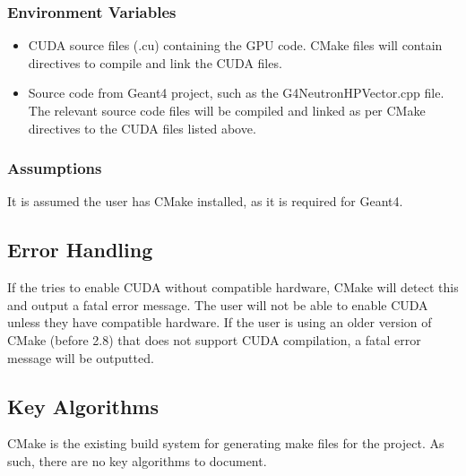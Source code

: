 \documentclass[12pt]{article}
\begin{document}
\subsubsection{Environment Variables}%
\begin{itemize}
\item CUDA source files (.cu) containing the GPU code. CMake files will contain directives to compile and link the CUDA files.
\item Source code from Geant4 project, such as the G4NeutronHPVector.cpp file. The relevant source code files will be compiled and linked as per CMake directives to the CUDA files listed above.
\end{itemize}

\subsubsection{Assumptions}%
It is assumed the user has CMake installed, as it is required for Geant4.

\subsection{Error Handling}
If the tries to enable CUDA without compatible hardware, CMake will detect this and output a fatal error message. The user will not be able to enable CUDA unless they have compatible hardware. If the user is using an older version of CMake (before 2.8) that does not support CUDA compilation, a fatal error message will be outputted.

\subsection{Key Algorithms}
CMake is the existing build system for generating make files for the project. As such, there are no key algorithms to document.

\end{document}
